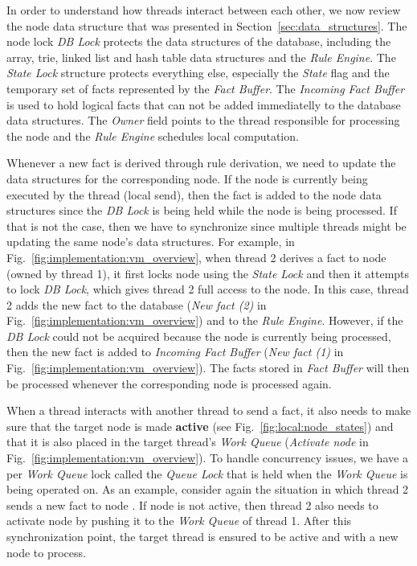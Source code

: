 In order to understand how threads interact between each other, we now review
the node data structure that was presented in Section~\ref{sec:data_structures}.
The node lock \emph{DB Lock} protects the data structures of the database,
including the array, trie, linked list and hash table data structures and the
\emph{Rule Engine}. The \emph{State Lock} structure protects everything else,
especially the \emph{State} flag and the temporary set of facts represented by
the \emph{Fact Buffer}. The \emph{Incoming Fact Buffer} is used to hold logical facts
that can not be added immediatelly to the database data structures. The
\emph{Owner} field points to the thread responsible for processing the node and
the \emph{Rule Engine} schedules local computation.

Whenever a new fact is derived through rule derivation, we need to update the
data structures for the corresponding node. If the node is currently being
executed by the thread (local send), then the fact is added to the node data
structures since the \emph{DB Lock} is being held while the node is being
processed. If that is not the case, then we have to synchronize since multiple
threads might be updating the same node's data structures. For example, in
Fig.~\ref{fig:implementation:vm_overview}, when thread 2 derives a fact to node
 (owned by thread 1), it first locks node  using the
\emph{State Lock} and then it attempts to lock \emph{DB Lock}, which gives thread
2 full access to the node. In this case, thread 2 adds the new fact to the
database (\emph{New fact (2)} in Fig.~\ref{fig:implementation:vm_overview}) and
to the \emph{Rule Engine}. However, if the \emph{DB Lock} could not be acquired
because the node  is currently being processed, then the new fact is
added to \emph{Incoming Fact Buffer} (\emph{New fact (1)} in
Fig.~\ref{fig:implementation:vm_overview}). The facts stored in \emph{Fact
Buffer} will then be processed whenever the corresponding node is processed
again.

When a thread interacts with another thread to send a fact, it also needs to
make sure that the target node is made \textbf{active} (see
Fig.~\ref{fig:local:node_states}) and that it is also placed in the target
thread's \emph{Work Queue} (\emph{Activate node} in
Fig.~\ref{fig:implementation:vm_overview}). To handle concurrency issues, we
have a per \emph{Work Queue} lock called the \emph{Queue Lock} that is held when
the \emph{Work Queue} is being operated on.  As an example, consider again the
situation in which thread 2 sends a new fact to node . If node
 is not active, then thread 2 also needs to activate node  by
pushing it to the \emph{Work Queue} of thread 1.  After this synchronization
point, the target thread is ensured to be active and with a new node to process.

